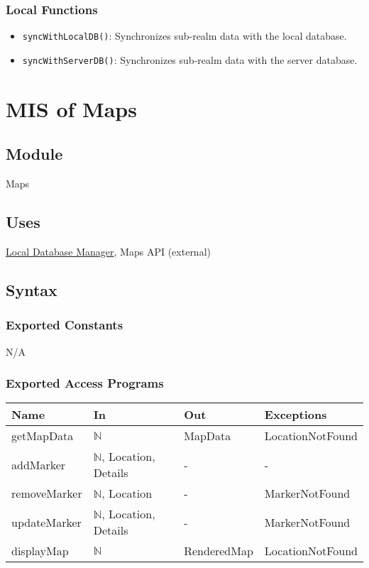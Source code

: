 \documentclass[12pt, titlepage]{article}
\begin{document}
\subsubsection{Local Functions}

\begin{itemize}
  \item \texttt{syncWithLocalDB()}: Synchronizes sub-realm data with the local database.
  \item \texttt{syncWithServerDB()}: Synchronizes sub-realm data with the server database.
\end{itemize}


\newpage


\section{MIS of Maps} \label{maps}

\subsection{Module}

Maps

\subsection{Uses}

\hyperref[local-dbm]{Local Database Manager}, Maps API (external)

\subsection{Syntax}

\subsubsection{Exported Constants}

N/A

\subsubsection{Exported Access Programs}

\begin{center}
  \begin{tabular}{p{4cm} p{3cm} p{3cm} p{4cm}}
    \hline
    \textbf{Name} & \textbf{In}                     & \textbf{Out} & \textbf{Exceptions} \\
    \hline
    getMapData    & $\mathbb{N}$                    & MapData      & LocationNotFound    \\
    addMarker     & $\mathbb{N}$, Location, Details & -            & -                   \\
    removeMarker  & $\mathbb{N}$, Location          & -            & MarkerNotFound      \\
    updateMarker  & $\mathbb{N}$, Location, Details & -            & MarkerNotFound      \\
    displayMap    & $\mathbb{N}$                    & RenderedMap  & LocationNotFound    \\
    \hline
  \end{tabular}
\end{center}
\end{document}
